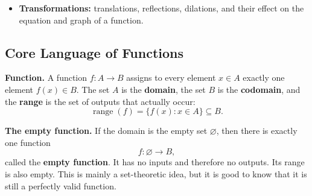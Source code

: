 \documentclass[12pt]{article}
\theoremstyle{definition}
\begin{document}
\begin{itemize}[leftmargin=*]
  \begin{center}
    \begin{minipage}[t]{0.45\textwidth}
      \centering
    \end{minipage}\hfill
    \begin{minipage}[t]{0.45\textwidth}
      \centering
    \end{minipage}
  \end{center}
  \item \textbf{Transformations:} translations, reflections, dilations, and their effect on the equation and graph of a function.
\end{itemize}

\subsection{Core Language of Functions}

\textbf{Function.} A function $f: A \to B$ assigns to every element $x \in A$ exactly one element $f(x) \in B$. The set $A$ is the \textbf{domain}, the set $B$ is the \textbf{codomain}, and the \textbf{range} is the set of outputs that actually occur:
\[
\operatorname{range}(f) = \{f(x) : x \in A\} \subseteq B.
\]

\textbf{The empty function.} If the domain is the empty set $\varnothing$, then there is exactly one function
\[
f:\varnothing \to B,
\]
called the \textbf{empty function}. It has no inputs and therefore no outputs. Its range is also empty. This is mainly a set-theoretic idea, but it is good to know that it is still a perfectly valid function.
\end{document}
